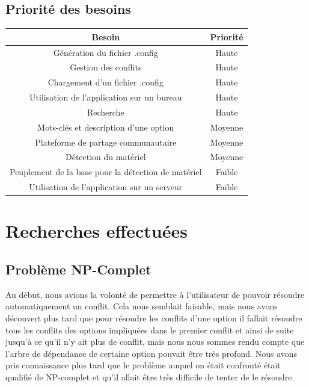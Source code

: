 \documentclass[17pts]{report}
\begin{document}
\subsection{Priorité des besoins}
\label{sub:Priorité des besoins}
\begin{tabular}{|c|c|}
    \hline
    Besoin & Priorité \\
    \hline
    \hline
    Génération du fichier .config & Haute \\
    \hline
    Gestion des conflits & Haute \\
    \hline
    Chargement d'un fichier .config & Haute \\
    \hline
    Utilisation de l'application sur un bureau & Haute \\
    \hline
    Recherche & Haute \\
    \hline
    Mots-clés et description d'une option & Moyenne \\
    \hline
    Plateforme de partage communautaire & Moyenne \\
    \hline
    Détection du matériel & Moyenne \\
    \hline
    Peuplement de la base pour la détection de matériel & Faible \\
    \hline
    Utilisation de l'application sur un serveur & Faible \\
    \hline
\end{tabular}

\section{Recherches effectuées}
\label{sec:Recherches effectuées}
\subsection{Problème NP-Complet}
\label{sub:Problème NP-Complet}
Au début, nous avions la volonté de permettre à l'utilisateur de pouvoir
résoudre automatiquement un conflit. Cela nous semblait faisable, mais nous
avons découvert plus tard que pour résoudre les conflits d'une option il
fallait résoudre tous les conflits des options impliquées dans le premier
conflit et ainsi de suite jusqu'à ce qu'il n'y ait plus de conflit, mais nous
nous sommes rendu compte que l'arbre de dépendance de certaine option pouvait
être très profond. Nous avons pris connaissance plus tard que le problème
auquel on était confronté était qualifié de NP-complet et qu'il allait être
très difficile de tenter de le résoudre.
\end{document}
